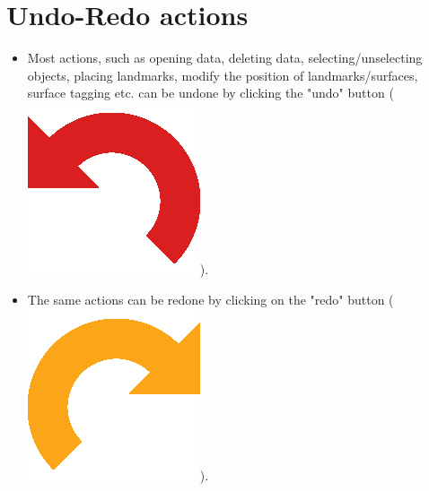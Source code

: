 \section{Undo-Redo actions}

\begin{itemize}
\item Most actions, such as opening data, deleting data, selecting/unselecting objects, placing landmarks, modify the position of landmarks/surfaces, surface tagging etc. can be undone by clicking the "undo" button (\includegraphics[scale=0.05]{images/03/undo.png}).
\item The same actions can be redone by clicking on the "redo" button (\includegraphics[scale=0.05]{images/03/redo.png}).
\end{itemize}

